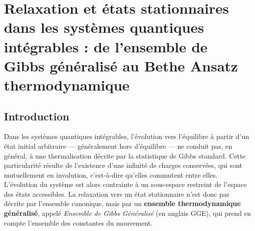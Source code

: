 \chapter{Relaxation et états stationnaires dans les systèmes quantiques intégrables : de l’ensemble de Gibbs généralisé au Bethe Ansatz thermodynamique
}\label{chap:relaxation}
\minitoc

\section*{Introduction}



Dans les systèmes quantiques intégrables, l’évolution vers l’équilibre à partir d’un état initial arbitraire — généralement hors d’équilibre — ne conduit pas, en général, à une thermalisation décrite par la statistique de Gibbs standard. 
Cette particularité résulte de l’existence d’une infinité de charges conservées, qui sont mutuellement en involution, c’est-à-dire qu’elles commutent entre elles. 
L’évolution du système est alors contrainte à un sous-espace restreint de l’espace des états accessibles. 
La relaxation vers un état stationnaire n’est donc pas décrite par l’ensemble canonique, mais par un \textbf{ensemble thermodynamique généralisé}, appelé \emph{Ensemble de Gibbs Généralisé} (en anglais \gls{GGE}), qui prend en compte l’ensemble des constantes du mouvement.


